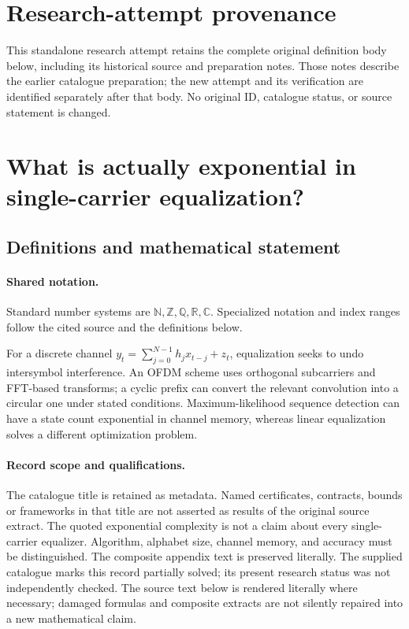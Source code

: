 \documentclass[11pt]{article}
\begin{document}
\section*{Research-attempt provenance}
This standalone research attempt retains the complete original definition body below,
including its historical source and preparation notes. Those notes describe the
earlier catalogue preparation; the new attempt and its verification are identified
separately after that body. No original ID, catalogue status, or source statement is changed.

\section{What is actually exponential in single-carrier equalization?}\label{statement}

\subsection{Definitions and mathematical statement}

\paragraph{Shared notation.}Standard number systems are $\mathbb N,\mathbb Z,\mathbb Q,\mathbb R,\mathbb C$. Specialized notation and index ranges follow the cited source and the definitions below.


For a discrete channel $y_t=\sum_{j=0}^{N-1}h_jx_{t-j}+z_t$, equalization seeks to undo intersymbol interference. An OFDM scheme uses orthogonal subcarriers and FFT-based transforms; a cyclic prefix can convert the relevant convolution into a circular one under stated conditions. Maximum-likelihood sequence detection can have a state count exponential in channel memory, whereas linear equalization solves a different optimization problem.
\paragraph{Record scope and qualifications.}
The catalogue title is retained as metadata. Named certificates, contracts, bounds or frameworks in that title are not asserted as results of the original source extract.
The quoted exponential complexity is not a claim about every single-carrier equalizer. Algorithm, alphabet size, channel memory, and accuracy must be distinguished. The composite appendix text is preserved literally. The supplied catalogue marks this record partially solved; its present research status was not independently checked.
The source text below is rendered literally where necessary; damaged formulas and composite extracts are not silently repaired into a new mathematical claim.
\end{document}
